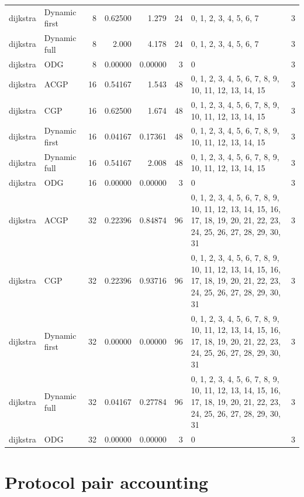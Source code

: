\documentclass[10pt,a4paper]{article}
\begin{document}
\begin{longtable}{@{}p{23mm}p{29mm}rrrrp{36mm}r@{}}
dijkstra & Dynamic first & 8 & 0.62500 & 1.279 & 24 & 0, 1, 2, 3, 4, 5, 6, 7 & 3 \\
dijkstra & Dynamic full & 8 & 2.000 & 4.178 & 24 & 0, 1, 2, 3, 4, 5, 6, 7 & 3 \\
dijkstra & ODG & 8 & 0.00000 & 0.00000 & 3 & 0 & 3 \\
dijkstra & ACGP & 16 & 0.54167 & 1.543 & 48 & 0, 1, 2, 3, 4, 5, 6, 7, 8, 9, 10, 11, 12, 13, 14, 15 & 3 \\
dijkstra & CGP & 16 & 0.62500 & 1.674 & 48 & 0, 1, 2, 3, 4, 5, 6, 7, 8, 9, 10, 11, 12, 13, 14, 15 & 3 \\
dijkstra & Dynamic first & 16 & 0.04167 & 0.17361 & 48 & 0, 1, 2, 3, 4, 5, 6, 7, 8, 9, 10, 11, 12, 13, 14, 15 & 3 \\
dijkstra & Dynamic full & 16 & 0.54167 & 2.008 & 48 & 0, 1, 2, 3, 4, 5, 6, 7, 8, 9, 10, 11, 12, 13, 14, 15 & 3 \\
dijkstra & ODG & 16 & 0.00000 & 0.00000 & 3 & 0 & 3 \\
dijkstra & ACGP & 32 & 0.22396 & 0.84874 & 96 & 0, 1, 2, 3, 4, 5, 6, 7, 8, 9, 10, 11, 12, 13, 14, 15, 16, 17, 18, 19, 20, 21, 22, 23, 24, 25, 26, 27, 28, 29, 30, 31 & 3 \\
dijkstra & CGP & 32 & 0.22396 & 0.93716 & 96 & 0, 1, 2, 3, 4, 5, 6, 7, 8, 9, 10, 11, 12, 13, 14, 15, 16, 17, 18, 19, 20, 21, 22, 23, 24, 25, 26, 27, 28, 29, 30, 31 & 3 \\
dijkstra & Dynamic first & 32 & 0.00000 & 0.00000 & 96 & 0, 1, 2, 3, 4, 5, 6, 7, 8, 9, 10, 11, 12, 13, 14, 15, 16, 17, 18, 19, 20, 21, 22, 23, 24, 25, 26, 27, 28, 29, 30, 31 & 3 \\
dijkstra & Dynamic full & 32 & 0.04167 & 0.27784 & 96 & 0, 1, 2, 3, 4, 5, 6, 7, 8, 9, 10, 11, 12, 13, 14, 15, 16, 17, 18, 19, 20, 21, 22, 23, 24, 25, 26, 27, 28, 29, 30, 31 & 3 \\
dijkstra & ODG & 32 & 0.00000 & 0.00000 & 3 & 0 & 3 \\
\end{longtable}\normalsize\setlength{\tabcolsep}{6pt}
\clearpage
\section*{Protocol pair accounting}
\clearpage
\end{document}
